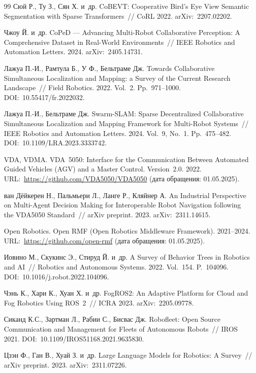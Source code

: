 \documentclass[14pt,a4paper]{extreport}
\begin{document}
\begin{thebibliography}{99}
Сюй Р., Ту З., Сян Х. и~др. CoBEVT: Cooperative Bird's Eye View Semantic Segmentation with Sparse Transformers~// CoRL 2022. arXiv:~2207.02202.

Чжоу Й. и~др. CoPeD --- Advancing Multi-Robot Collaborative Perception: A Comprehensive Dataset in Real-World Environments~// IEEE Robotics and Automation Letters. 2024. arXiv:~2405.14731.

Лажуа П.-И., Рамтула Б., У Ф., Бельтраме Дж. Towards Collaborative Simultaneous Localization and Mapping: a Survey of the Current Research Landscape~// Field Robotics. 2022. Vol.~2. Pp.~971--1000. DOI:~10.55417/fr.2022032.

Лажуа П.-И., Бельтраме Дж. Swarm-SLAM: Sparse Decentralized Collaborative Simultaneous Localization and Mapping Framework for Multi-Robot Systems~// IEEE Robotics and Automation Letters. 2024. Vol.~9, No.~1. Pp.~475--482. DOI:~10.1109/LRA.2023.3333742.

VDA, VDMA. VDA~5050: Interface for the Communication Between Automated Guided Vehicles (AGV) and a Master Control. Version~2.0. 2022. URL:~\url{https://github.com/VDA5050/VDA5050} (дата обращения: 01.05.2025).

ван Дёйкерен Н., Пальмьери Л., Ланге Р., Кляйнер А. An Industrial Perspective on Multi-Agent Decision Making for Interoperable Robot Navigation following the VDA5050 Standard~// arXiv preprint. 2023. arXiv:~2311.14615.

Open Robotics. Open RMF (Open Robotics Middleware Framework). 2021--2024. URL:~\url{https://github.com/open-rmf} (дата обращения: 01.05.2025).

Иовино М., Скукинс Э., Стируд Й. и~др. A Survey of Behavior Trees in Robotics and AI~// Robotics and Autonomous Systems. 2022. Vol.~154. P.~104096. DOI:~10.1016/j.robot.2022.104096.

Чэнь К., Хари К., Хуан Х. и~др. FogROS2: An Adaptive Platform for Cloud and Fog Robotics Using ROS~2~// ICRA 2023. arXiv:~2205.09778.

Сиканд К.С., Зартман Л., Рабии С., Бисвас Дж. Robofleet: Open Source Communication and Management for Fleets of Autonomous Robots~// IROS 2021. DOI:~10.1109/IROS51168.2021.9635830.

Цзэн Ф., Ган В., Хуай З. и~др. Large Language Models for Robotics: A Survey~// arXiv preprint. 2023. arXiv:~2311.07226.


\end{thebibliography}
\end{document}
